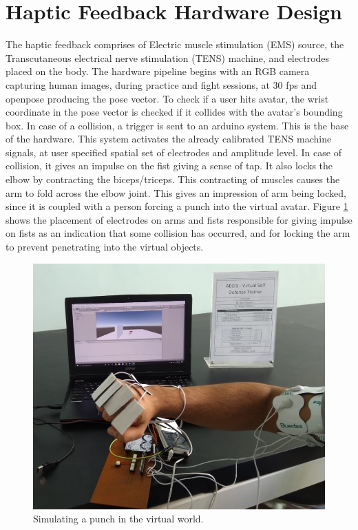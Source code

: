 \section{Haptic Feedback Hardware Design}

The haptic feedback comprises of Electric muscle stimulation (EMS) source, the Transcutaneous electrical nerve stimulation (TENS) machine, and electrodes placed on the body. The hardware pipeline begins with an RGB camera capturing human images, during practice and fight sessions, at 30 fps and openpose producing the pose vector. To check if a user hits avatar, the wrist coordinate in the pose vector is checked if it collides with the avatar's bounding box. In case of a collision, a trigger is sent to an arduino system. This is the base of the hardware. This system activates the already calibrated TENS machine signals, at user specified spatial set of electrodes and amplitude level. In case of collision, it gives an impulse on the fist giving a sense of tap. It also locks the elbow by contracting the biceps/triceps. This contracting of muscles causes the arm to fold across the elbow joint. This gives an impression of arm being locked, since it is coupled with a person forcing a punch into the virtual avatar. Figure \ref{fig:punchSimulation} shows the placement of electrodes on arms and fists responsible for giving impulse on fists as an indication that some collision has occurred, and for locking the arm to prevent penetrating into the virtual objects. 

\begin{figure}
    \centering
    \includegraphics[scale=.7]{images/setup.jpg}
    \caption{Simulating a punch in the virtual world.}
    \label{fig:punchSimulation}
\end{figure}


